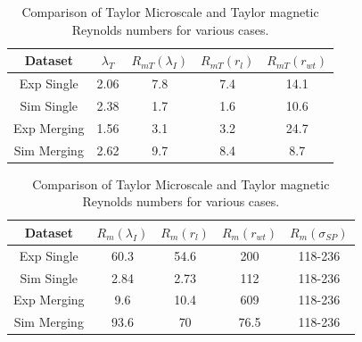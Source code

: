 \documentclass[aip,prl,amsmath,amssymb,reprint,superscriptaddress]{revtex4-1} %
\begin{document}
\begin{table} [htbp]
\caption{\label{tab:Rms1}Comparison of Taylor Microscale and Taylor magnetic Reynolds numbers for various cases.}
\begin{tabular}{ccccc}
\toprule
Dataset								& $\lambda_{T}$	&$R_{mT}(\lambda_{I})$&$R_{mT}(r_{l})$&$R_{mT}(r_{wt})$\\
\hline
Exp Single  					& 2.06 					& 7.8 								& 7.4						&14.1\\
Sim Single  					& 2.38 					& 1.7 								& 1.6						&10.6\\
Exp Merging 					& 1.56 					& 3.1 								& 3.2						&24.7\\
Sim Merging 					& 2.62 					& 9.7 								& 8.4						&8.7\\
\hline
\end{tabular}
\end{table}

\begin{table} [htbp]
\caption{\label{tab:Rms2}Comparison of Taylor Microscale and Taylor magnetic Reynolds numbers for various cases.}
\begin{tabular}{ccccc}
\toprule
Dataset								&$R_{m}(\lambda_{I})$&$R_{m}(r_{l})$&$R_{m}(r_{wt})$&$R_{m}(\sigma_{SP})$\\
\hline
Exp Single  					& 60.3 								& 54.6						&200					&118-236\\
Sim Single  					& 2.84 								& 2.73						&112					&118-236\\
Exp Merging 					& 9.6 								& 10.4						&609					&118-236\\
Sim Merging 					& 93.6 								& 70							&76.5					&118-236\\
\hline
\end{tabular}
\end{table}
\end{document}
